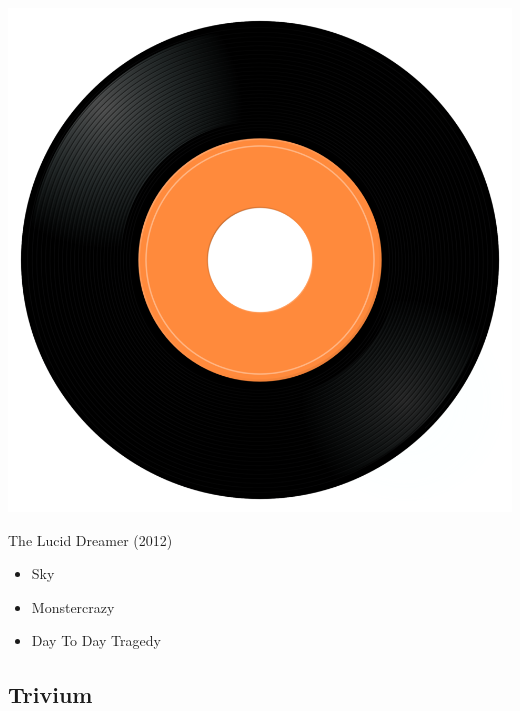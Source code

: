 \begin{minipage}[t]{0.25\textwidth}
\captionsetup{type=figure}
\includegraphics[width=\textwidth]{Images/cover.png}
\caption*{The Lucid Dreamer (2012)}
\end{minipage}
\begin{minipage}[t]{0.25\textwidth}\vspace{0pt}
\begin{itemize}[nosep,leftmargin=1em,labelwidth=*,align=left]
	\setlength{\itemsep}{0pt}
	\item Sky
	\item Monstercrazy
	\item Day To Day Tragedy
\end{itemize}
\end{minipage}

\subsection{Trivium}

